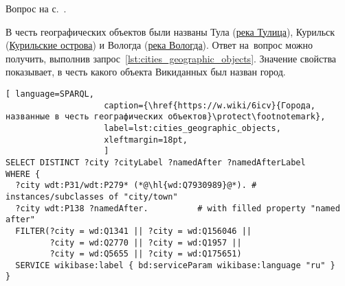 \hfil{}\hfil%
\begin{task}
    \label{answer:cities_geographic_objects}
    \AnswerBackref Вопрос на с.~\pageref{lst:population_town}.

    В честь географических объектов были названы 
    Тула (\href{https://w.wiki/oLJ}{река Тулица}), 
    Курильск (\href{https://w.wiki/oLH}{Курильские острова}) 
    и Вологда (\href{https://w.wiki/oLG}{река Вологда}). 
    Ответ на~вопрос можно получить, выполнив запрос~\ref{lst:cities_geographic_objects}. 
    Значение свойства  
    показывает, в честь какого объекта Викиданных был назван город.

%
\begin{lstlisting}[ language=SPARQL, 
                    caption={\href{https://w.wiki/6icv}{Города, названные в честь географических объектов}\protect\footnotemark},
                    label=lst:cities_geographic_objects,
                    xleftmargin=18pt, 
                    ]
SELECT DISTINCT ?city ?cityLabel ?namedAfter ?namedAfterLabel 
WHERE {
  ?city wdt:P31/wdt:P279* (*@\hl{wd:Q7930989}@*). # instances/subclasses of "city/town" 
  ?city wdt:P138 ?namedAfter.          # with filled property "named after"
  FILTER(?city = wd:Q1341 || ?city = wd:Q156046 ||
         ?city = wd:Q2770 || ?city = wd:Q1957 ||
         ?city = wd:Q5655 || ?city = wd:Q175651)
  SERVICE wikibase:label { bd:serviceParam wikibase:language "ru" }
}
\end{lstlisting}%
\end{task}




